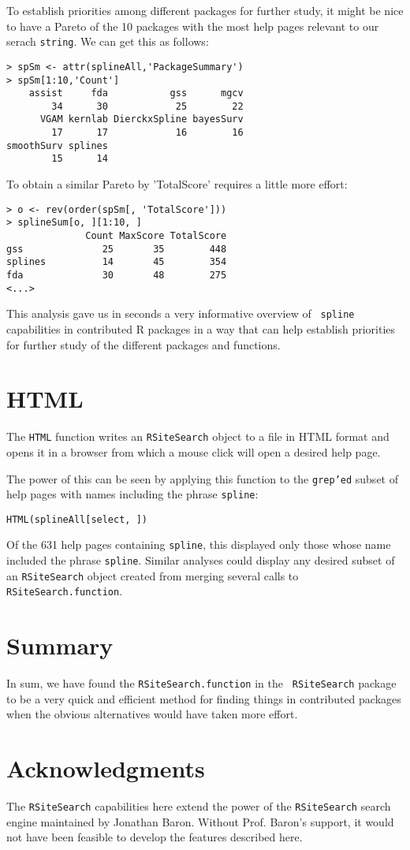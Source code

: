 To establish priorities among different packages for further study, it
might be nice to have a Pareto of the 10 packages with the most help
pages relevant to our serach {\tt string}.  We can get this as
follows:
\begin{verbatim}
> spSm <- attr(splineAll,'PackageSummary')
> spSm[1:10,'Count']
    assist     fda           gss      mgcv
        34      30            25        22
      VGAM kernlab DierckxSpline bayesSurv
        17      17            16        16
smoothSurv splines
        15      14
\end{verbatim}
To obtain a similar Pareto by 'TotalScore' requires a little more
effort:
\begin{verbatim}
> o <- rev(order(spSm[, 'TotalScore']))
> splineSum[o, ][1:10, ]
              Count MaxScore TotalScore
gss              25       35        448
splines          14       45        354
fda              30       48        275
<...>
\end{verbatim}
This analysis gave us in seconds a very informative overview of {\tt
spline} capabilities in contributed R packages in a way that can help
establish priorities for further study of the different packages and
functions.

\section*{HTML}
The {\tt HTML} function writes an {\tt RSiteSearch} object to a file 
in HTML format and opens it in a browser from which a mouse click will 
open a desired help page.  

The power of this can be seen by applying this function to the 
{\tt grep'ed} subset of help pages with names including the phrase 
{\tt spline}:  

\begin{verbatim} 
HTML(splineAll[select, ])
\end{verbatim} 

Of the 631 help pages containing {\tt spline}, this displayed only 
those whose name included the phrase {\tt spline}.  Similar analyses 
could display any desired subset of an {\tt RSiteSearch} object 
created from merging several calls to {\tt RSiteSearch.function}.  

\section*{Summary}
In sum, we have found the {\tt RSiteSearch.function} in the {\tt
RSiteSearch} package to be a very quick and efficient method for
finding things in contributed packages when the obvious alternatives
would have taken more effort.

\section*{Acknowledgments} 
The {\tt RSiteSearch} capabilities here extend the power of the 
{\tt RSiteSearch} search engine maintained by Jonathan Baron.  
Without Prof. Baron's support, it would not have been feasible 
to develop the features described here.  
